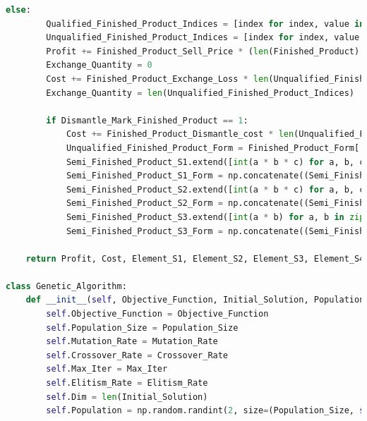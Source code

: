 \documentclass[withoutpreface,bwprint]{cumcmthesis} %
\begin{document}
\begin{appendices}
\begin{lstlisting}[language=python]
    else:
        Qualified_Finished_Product_Indices = [index for index, value in enumerate(Finished_Product) if value == 1]
        Unqualified_Finished_Product_Indices = [index for index, value in enumerate(Finished_Product) if value == 0]
        Profit += Finished_Product_Sell_Price * (len(Finished_Product) - Exchange_Quantity)
        Exchange_Quantity = 0
        Cost += Finished_Product_Exchange_Loss * len(Unqualified_Finished_Product_Indices)
        Exchange_Quantity = len(Unqualified_Finished_Product_Indices)

        if Dismantle_Mark_Finished_Product == 1:
            Cost += Finished_Product_Dismantle_cost * len(Unqualified_Finished_Product_Indices)
            Unqualified_Finished_Product_Form = Finished_Product_Form[:, Unqualified_Finished_Product_Indices]
            Semi_Finished_Product_S1.extend([int(a * b * c) for a, b, c in zip(Unqualified_Finished_Product_Form[0], Unqualified_Finished_Product_Form[1], Unqualified_Finished_Product_Form[2])])
            Semi_Finished_Product_S1_Form = np.concatenate((Semi_Finished_Product_S1_Form, np.array([Unqualified_Finished_Product_Form[0].tolist(), Unqualified_Finished_Product_Form[1].tolist(), Unqualified_Finished_Product_Form[2].tolist()])), axis=1)
            Semi_Finished_Product_S2.extend([int(a * b * c) for a, b, c in zip(Unqualified_Finished_Product_Form[3], Unqualified_Finished_Product_Form[4], Unqualified_Finished_Product_Form[5])])
            Semi_Finished_Product_S2_Form = np.concatenate((Semi_Finished_Product_S2_Form, np.array([Unqualified_Finished_Product_Form[3].tolist(), Unqualified_Finished_Product_Form[4].tolist(), Unqualified_Finished_Product_Form[5].tolist()])), axis=1)
            Semi_Finished_Product_S3.extend([int(a * b) for a, b in zip(Unqualified_Finished_Product_Form[6], Unqualified_Finished_Product_Form[7])])
            Semi_Finished_Product_S3_Form = np.concatenate((Semi_Finished_Product_S3_Form, np.array([Unqualified_Finished_Product_Form[6].tolist(), Unqualified_Finished_Product_Form[7].tolist()])), axis=1)

    return Profit, Cost, Element_S1, Element_S2, Element_S3, Element_S4, Element_S5, Element_S6, Element_S7, Element_S8, Semi_Finished_Product_S1, Semi_Finished_Product_S2, Semi_Finished_Product_S3, Semi_Finished_Product_S1_Form, Semi_Finished_Product_S2_Form, Semi_Finished_Product_S3_Form, Exchange_Quantity

class Genetic_Algorithm:
    def __init__(self, Objective_Function, Initial_Solution, Population_Size=100, Mutation_Rate=0.1, Crossover_Rate=0.5, Max_Iter=100, Elitism_Rate=0.05):
        self.Objective_Function = Objective_Function
        self.Population_Size = Population_Size
        self.Mutation_Rate = Mutation_Rate
        self.Crossover_Rate = Crossover_Rate
        self.Max_Iter = Max_Iter
        self.Elitism_Rate = Elitism_Rate
        self.Dim = len(Initial_Solution)
        self.Population = np.random.randint(2, size=(Population_Size, self.Dim))


\end{lstlisting}
\end{appendices}
\end{document}

